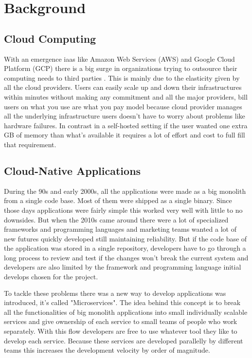 

{\let\clearpage\relax \chapter{Background}}

\section{Cloud Computing}
With an emergence \ac{iaas} like Amazon Web Services (AWS) and Google Cloud Platform (GCP) there is a big surge in organizations trying to outsource their computing needs to third parties \citep{rimol_2021}. This is mainly due to the elasticity given by all the cloud providers. Users can easily scale up and down their infrastructures within minutes without making any commitment and all the major providers, bill users on what you use are what you pay model because cloud provider manages all the underlying infrastructure users doesn't have to worry about problems like hardware failures. In contrast in a self-hosted setting if the user wanted one extra GB of memory than what's available it requires a lot of effort and cost to full fill that requirement.

\section{Cloud-Native Applications}
During the 90s and early 2000s, all the applications were made as a big monolith from a single code base. Most of them were shipped as a single binary. Since those days applications were fairly simple this worked very well with little to no downsides. But when the 2010s came around there were a lot of specialized frameworks and programming languages and marketing teams wanted a lot of new futures quickly developed still maintaining reliability. But if the code base of the application was stored in a single repository, developers have to go through a long process to review and test if the changes won't break the current system and developers are also limited by the framework and programming language initial develops chosen for the project.

To tackle these problems there was a new way to develop applications was introduced, it's called "Microservices". The idea behind this concept is to break all the functionalities of big monolith applications into small individually scalable services and give ownership of each service to small teams of people who work separately. With this flow developers are free to use whatever tool they like to develop each service. Because these services are developed parallelly by different teams this increases the development velocity by order of magnitude. \citep{Understa56:online}

